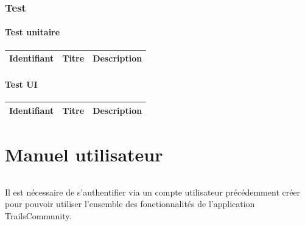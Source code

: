 \documentclass[titlepage, 12pt]{report}
\begin{document}
\section{Test}

\subsection{Test unitaire}

\begin{center}
	\begin{tabular}{|c|c|c|}
		\hline
		Identifiant & Titre & Description \\
		\hline \hline
	\end{tabular}
\end{center}

\subsection{Test UI}

\begin{center}
	\begin{tabular}{|c|c|c|}
		\hline
		Identifiant & Titre & Description \\
		\hline \hline
	\end{tabular}
\end{center}

\part{Manuel utilisateur}

\paragraph{}Il est nécessaire de s'authentifier via un compte utilisateur précédemment créer pour pouvoir utiliser l'ensemble des fonctionnalités de l'application TrailsCommunity.
\end{document}

